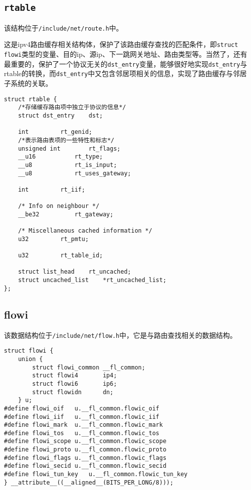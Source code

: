         \subsection{\texttt{rtable}}

            该结构位于\texttt{/include/net/route.h}中。

            这是ipv4路由缓存相关结构体，保护了该路由缓存查找的匹配条件，即\texttt{struct flowi}类型的变量、目的ip、源ip、下一跳网关地址、路由类型等。当然了，还有最重要的，保护了一个协议无关的\texttt{dst_entry}变量，能够很好地实现\texttt{dst_entry}与rtable的转换，而\texttt{dst_entry}中又包含邻居项相关的信息，实现了路由缓存与邻居子系统的关联。

\begin{verbatim}
struct rtable {
	/*存储缓存路由项中独立于协议的信息*/
    struct dst_entry    dst;		

    int         rt_genid;
	/*表示路由表项的一些特性和标志*/
    unsigned int        rt_flags;
    __u16           rt_type;
    __u8            rt_is_input;
    __u8            rt_uses_gateway;

    int         rt_iif;

    /* Info on neighbour */
    __be32          rt_gateway;

    /* Miscellaneous cached information */
    u32         rt_pmtu;

    u32         rt_table_id;

    struct list_head    rt_uncached;
    struct uncached_list    *rt_uncached_list;
};
\end{verbatim}

        \subsection{flowi}

            该数据结构位于\texttt{/include/net/flow.h}中，它是与路由查找相关的数据结构。
\begin{verbatim}
struct flowi {
    union {
        struct flowi_common __fl_common;
        struct flowi4       ip4;
        struct flowi6       ip6;
        struct flowidn      dn;
    } u;
#define flowi_oif   u.__fl_common.flowic_oif
#define flowi_iif   u.__fl_common.flowic_iif
#define flowi_mark  u.__fl_common.flowic_mark
#define flowi_tos   u.__fl_common.flowic_tos
#define flowi_scope u.__fl_common.flowic_scope
#define flowi_proto u.__fl_common.flowic_proto
#define flowi_flags u.__fl_common.flowic_flags
#define flowi_secid u.__fl_common.flowic_secid
#define flowi_tun_key   u.__fl_common.flowic_tun_key
} __attribute__((__aligned__(BITS_PER_LONG/8)));
\end{verbatim}
